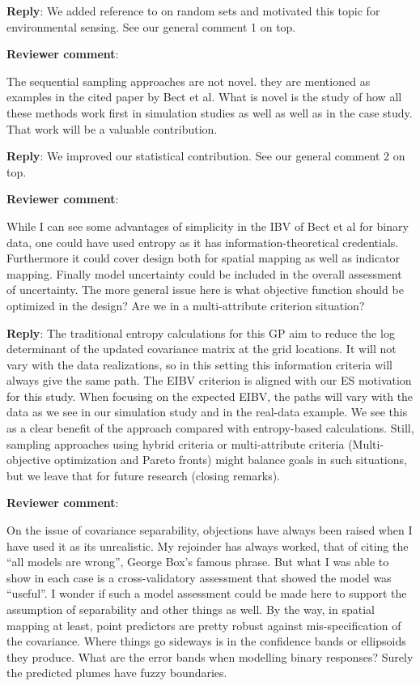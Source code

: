 \documentclass[a4paper]{article}
\def\revcom{\textbf{Reviewer comment}}
\def\reply{\textbf{Reply}}
\begin{document}
\begin{answers}
\reply: We added reference to \cite{adler2009random} on random sets and motivated this topic for environmental sensing. See our general comment 1 on top. 

\item{\revcom :}\label{r1c7}

 The sequential sampling approaches are not novel. they are mentioned as examples in the cited paper by Bect et al. What is novel is the study of how all these methods work first in simulation studies as well as well as in the case study. That work will be a valuable contribution.

\reply: We improved our statistical contribution. See our general comment 2 on top.

\item{\revcom  :}\label{r1c8}

While I can see some advantages of simplicity in the IBV of Bect et al for binary data, one could have used entropy as it has information-theoretical credentials. Furthermore it could cover design both for spatial mapping as well as indicator mapping. Finally model uncertainty could be included in the overall assessment of uncertainty. The more general issue here is what objective function should be optimized in the design? Are we in a multi-attribute criterion situation?

\reply: The traditional entropy calculations for this GP aim to reduce the log determinant of the updated covariance matrix at the grid locations. It will not vary with the data realizations, so in this setting this information criteria will always give the same path. The EIBV criterion is aligned with our ES motivation for this study. When focusing on the expected EIBV, the paths will vary with the data as we see in our simulation study and in the real-data example. We see this as a clear benefit of the approach compared with entropy-based calculations. Still, sampling approaches using hybrid criteria or multi-attribute criteria (Multi-objective optimization and Pareto fronts) might balance goals in such situations, but we leave that for future research (closing remarks). 

\item{\revcom  :}\label{r1c9}

On the issue of covariance separability, objections have always been raised when I have used it as its unrealistic. My rejoinder has always worked, that of citing the “all models are wrong”, George Box’s famous phrase. But what I was able to show in each case is a cross-validatory assessment that showed the model was “useful”. I wonder if such a model assessment could be made here to support the assumption of separability and other things as well. By the way, in spatial mapping at least, point predictors are pretty robust against mis-specification of the covariance. Where things go sideways is in the confidence bands or ellipsoids they produce. What are the error bands when modelling binary responses? Surely the predicted plumes have fuzzy boundaries. 


\end{answers}
\end{document}
